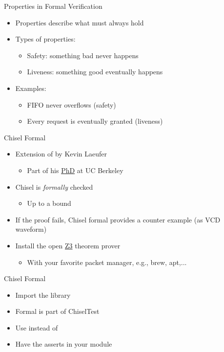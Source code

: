 \begin{frame}{Properties in Formal Verification}
\begin{itemize}
    \item Properties describe what must always hold
    \item Types of properties:
    \begin{itemize}
        \item Safety: something bad never happens
        \item Liveness: something good eventually happens
    \end{itemize}
    \item Examples:
    \begin{itemize}
        \item FIFO never overflows (safety)
        \item Every request is eventually granted (liveness)
    \end{itemize}
\end{itemize}
\end{frame}


\begin{frame}[fragile]{Chisel Formal}
\begin{itemize}
\item Extension of  by Kevin Laeufer
\begin{itemize}
\item Part of his \href{https://www2.eecs.berkeley.edu/Pubs/TechRpts/2024/EECS-2024-157.pdf}{PhD} at UC Berkeley
\end{itemize}
\item Chisel  is \emph{formally} checked
\begin{itemize}
\item Up to a bound
\end{itemize}
\item If the proof fails, Chisel formal provides a counter example (as VCD waveform)
\item Install the open \href{https://github.com/Z3Prover/z3}{Z3} theorem prover
\begin{itemize}
\item With your favorite packet manager, e.g., brew, apt,...
\end{itemize}
\end{itemize}
\end{frame}

\begin{frame}[fragile]{Chisel Formal}
\begin{itemize}
\item Import the library
\item Formal is part of ChiselTest
\item Use  instead of 
\item Have the asserts in your module
\end{itemize}
\end{frame}

